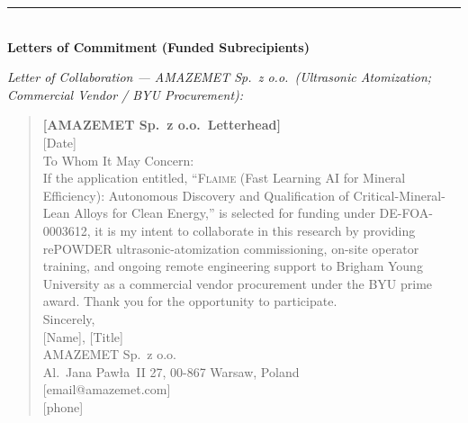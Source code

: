 \documentclass[11pt,letterpaper]{article}
\newcommand{\flaime}{\textsc{Flaime}}
\newcommand{\projecttitle}{\flaime{} (Fast Learning AI for Mineral
Efficiency): Autonomous Discovery and Qualification of
Critical-Mineral-Lean Alloys for Clean Energy}
\begin{document}


\bigskip
\noindent\rule{\textwidth}{0.4pt}\\
\textbf{Letters of Commitment (Funded Subrecipients)}



\clearpage
\textit{Letter of Collaboration --- AMAZEMET Sp.\ z o.o.\ (Ultrasonic
Atomization; Commercial Vendor / BYU Procurement):}

\begin{quote}\small
\textbf{{[}AMAZEMET Sp.\ z o.o.\ Letterhead{]}}\\[4pt]
{[}Date{]}\\[6pt]
To Whom It May Concern:\\[4pt]
If the application entitled, ``\projecttitle{},'' is selected for funding
under DE-FOA-0003612, it is my intent to collaborate in this research by
providing rePOWDER ultrasonic-atomization commissioning, on-site operator
training, and ongoing remote engineering support to Brigham Young
University as a commercial vendor procurement under the BYU prime award.
Thank you for the opportunity to participate.\\[12pt]
Sincerely,\\[4pt]
{[}Name{]}, {[}Title{]}\\
AMAZEMET Sp.\ z o.o.\\
Al.\ Jana Paw{\l}a~II 27, 00-867 Warsaw, Poland\\
{[}email@amazemet.com{]}\\
{[}phone{]}
\end{quote}

\newpage
\end{document}
